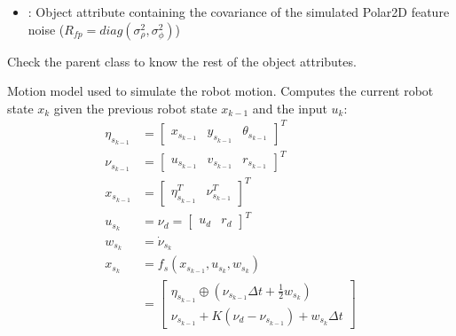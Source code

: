 \documentclass[letterpaper,10pt,english]{sphinxmanual}
\begin{document}
\begin{fulllineitems}
\begin{fulllineitems}
\begin{itemize}
\item {} 
\sphinxAtStartPar
{} : Object attribute containing the covariance of the simulated Polar2D feature noise (\(R_{fp}=diag(\sigma_{\rho}^2,\sigma_{\phi}^2)\))

\end{itemize}

\sphinxAtStartPar
Check the parent class  to know the rest of the object attributes.

\end{fulllineitems}


\begin{fulllineitems}
\label{\detokenize{robot_simulation:DifferentialDriveSimulatedRobot.DifferentialDriveSimulatedRobot.fs}}
\sphinxAtStartPar
Motion model used to simulate the robot motion. Computes the current robot state \(x_k\) given the previous robot state \(x_{k-1}\) and the input \(u_k\):
\begin{equation}\label{equation:robot_simulation:eq:fs}
\begin{split}\eta_{s_{k-1}}&=\begin{bmatrix}x_{s_{k-1}} & y_{s_{k-1}} & \theta_{s_{k-1}}\end{bmatrix}^T\\
\nu_{s_{k-1}}&=\begin{bmatrix} u_{s_{k-1}} &  v_{s_{k-1}} & r_{s_{k-1}}\end{bmatrix}^T\\
x_{s_{k-1}}&=\begin{bmatrix}\eta_{s_{k-1}}^T & \nu_{s_{k-1}}^T\end{bmatrix}^T\\
u_{s_k}&=\nu_{d}=\begin{bmatrix} u_d& r_d\end{bmatrix}^T\\
w_{s_k}&=\dot \nu_{s_k}\\
x_{s_k}&=f_s(x_{s_{k-1}},u_{s_k},w_{s_k}) \\
&=\begin{bmatrix}
\eta_{s_{k-1}} \oplus (\nu_{s_{k-1}}\Delta t + \frac{1}{2} w_{s_k}) \\
\nu_{s_{k-1}}+K(\nu_{d}-\nu_{s_{k-1}}) + w_{s_k} \Delta t

\end{bmatrix}
\end{split}
\end{equation}
\end{fulllineitems}
\end{fulllineitems}
\end{document}
